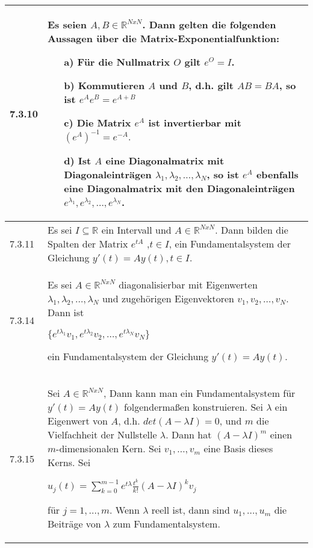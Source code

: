     \begin{longtable}{p{1cm} p{16cm}}
        \toprule

        7.3.10& Es seien $A,B \in \mathbb{R}^{NxN}$. Dann gelten die folgenden Aussagen über die Matrix-Exponentialfunktion:
                \begin{itemize}[topsep=-0.5cm]
                    \item[a)] Für die Nullmatrix $O$ gilt $e^O = I$.
                    \item[b)] Kommutieren $A$ und $B$, d.h. gilt $AB = BA$, so ist $e^Ae^B = e^{A+B}$
                    \item[c)] Die Matrix $e^A$ ist invertierbar mit $(e^A)^{-1} = e^{-A}.$
                    \item[d)] Ist $A$ eine Diagonalmatrix mit Diagonaleinträgen $\lambda_1,\lambda_2, \dots,\lambda_N$, so ist
                                $e^A$ ebenfalls eine Diagonalmatrix mit den Diagonaleinträgen $e^{\lambda_1},e^{\lambda_2},\dots,e^{\lambda_N}$.
                \end{itemize} \vspace{-0cm} \\
        \midrule
        7.3.11& Es sei $I \subseteq \mathbb{R}$ ein Intervall und $A \in \mathbb{R}^{NxN}$. Dann bilden die Spalten der Matrix $e^{tA}$
                ,$t\in I$, ein Fundamentalsystem der Gleichung $y'(t) = Ay(t), t\in I$. \\
        \midrule
        7.3.14& Es sei $A \in \mathbb{R}^{NxN}$ diagonalisierbar mit Eigenwerten $\lambda_1, \lambda_2, \dots, \lambda_N$ und zugehörigen
                Eigenvektoren $v_1, v_2, \dots, v_N$. Dann ist \hfill \break
                \centerline{$ \{e^{t \lambda_1}v_1, e^{t \lambda_2}v_2, \dots, e^{t\lambda_N}v_N\} $}
                ein Fundamentalsystem der Gleichung $y'(t) = Ay(t).$ \\
        \midrule
        7.3.15& Sei $A \in \mathbb{R}^{NxN}$, Dann kann man ein Fundamentalsystem für $y'(t) = Ay(t)$ folgendermaßen konstruieren. Sei 
                $\lambda$ ein Eigenwert von $A$, d.h. $det(A-\lambda I) = 0$, und $m$ die Vielfachheit der Nullstelle $\lambda$. Dann hat
                $(A- \lambda I)^m$ einen $m$-dimensionalen Kern. Sei $v_1,\dots, v_m$ eine Basis dieses Kerns. Sei \hfill \break
                \centerline{$ u_j(t) = \sum_{k=0}^{m-1} e^{t\lambda}  \frac{t^k}{k!} (A- \lambda I)^k v_j$}
                für $j = 1, \dots, m$. \hfill \break
                Wenn $\lambda$ reell ist, dann sind $u_1, \dots, u_m$ die Beiträge von $\lambda$ zum Fundamentalsystem. \hfill \break

\end{longtable}
